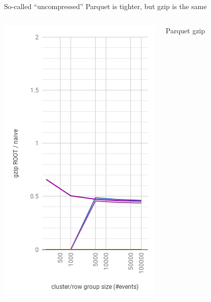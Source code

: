 \documentclass[aspectratio=169]{beamer}
\begin{document}
\begin{frame}{So-called ``uncompressed'' Parquet is tighter, but gzip is the same}
\begin{columns}
\begin{center}
\includegraphics[width=\linewidth]{root-gzip.png}
\end{center}
\begin{center}
Parquet gzip


\end{center}
\end{columns}
\end{frame}
\end{document}
